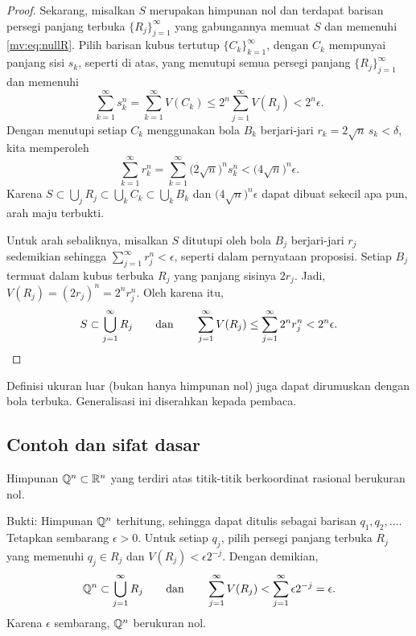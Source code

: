 \begin{proof}
Sekarang, misalkan $S$ merupakan himpunan nol dan terdapat barisan persegi
panjang terbuka $\{R_j\}_{j=1}^\infty$ yang gabungannya memuat $S$ dan memenuhi
\eqref{mv:eq:nullR}. Pilih barisan kubus tertutup
$\{C_k\}_{k=1}^\infty$, dengan $C_k$ mempunyai panjang sisi $s_k$, seperti di
atas, yang menutupi semua persegi panjang $\{R_j\}_{j=1}^\infty$ dan memenuhi
\begin{equation*}
\sum_{k=1}^\infty s_k^n =
\sum_{k=1}^\infty V(C_k) \leq
2^n \sum_{j=1}^\infty V(R_j)
< 2^n \epsilon.
\end{equation*}
Dengan menutupi setiap $C_k$ menggunakan bola $B_k$ berjari-jari
$r_k=2\sqrt{n}\,s_k<\delta$, kita memperoleh
\begin{equation*}
\sum_{k=1}^\infty r_k^n
=
\sum_{k=1}^\infty {\bigl(2\sqrt{n}\bigr)}^n s_k^n
<
{\bigl(4\sqrt{n}\bigr)}^n \epsilon .
\end{equation*}
Karena $S \subset\bigcup_j R_j \subset\bigcup_k C_k \subset\bigcup_k B_k$
dan ${\bigl(4\sqrt{n}\bigr)}^n\epsilon$ dapat dibuat sekecil apa pun, arah maju
terbukti.

Untuk arah sebaliknya, misalkan $S$ ditutupi oleh bola $B_j$ berjari-jari
$r_j$ sedemikian sehingga $\sum_{j=1}^\infty r_j^n<\epsilon$, seperti dalam
pernyataan proposisi. Setiap $B_j$ termuat dalam kubus terbuka $R_j$ yang
panjang sisinya $2r_j$. Jadi, $V(R_j)={(2r_j)}^n=2^n r_j^n$. Oleh karena itu,
\begin{equation*}
S \subset \bigcup_{j=1}^\infty R_j \qquad \text{dan} \qquad
\sum_{j=1}^\infty V(R_j)
\leq
\sum_{j=1}^\infty 2^n r_j^n < 2^n \epsilon. \qedhere
\end{equation*}
\end{proof}

Definisi ukuran luar (bukan hanya himpunan nol) juga dapat dirumuskan dengan
bola terbuka. Generalisasi ini diserahkan kepada pembaca.

\subsection{Contoh dan sifat dasar}

\begin{example}
Himpunan ${\mathbb{Q}}^n \subset {\mathbb{R}}^n$ yang terdiri atas titik-titik berkoordinat
rasional berukuran nol.

Bukti:
Himpunan ${\mathbb{Q}}^n$ terhitung, sehingga dapat ditulis sebagai barisan
$q_1,q_2,\ldots$. Tetapkan sembarang $\epsilon>0$. Untuk setiap $q_j$, pilih
persegi panjang terbuka $R_j$ yang memenuhi $q_j \in R_j$ dan
$V(R_j)<\epsilon 2^{-j}$. Dengan demikian,
\begin{equation*}
{\mathbb{Q}}^n \subset \bigcup_{j=1}^\infty R_j \qquad \text{dan} \qquad
\sum_{j=1}^\infty V(R_j) <
\sum_{j=1}^\infty \epsilon 2^{-j} = \epsilon .
\end{equation*}
Karena $\epsilon$ sembarang, ${\mathbb{Q}}^n$ berukuran nol.
\end{example}

